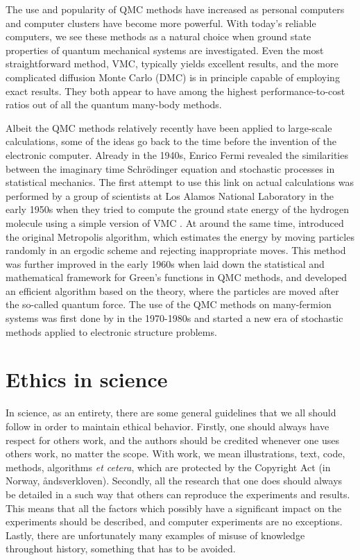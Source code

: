 The use and popularity of QMC methods have increased as personal computers and computer clusters have become more powerful. With today's reliable computers, we see these methods as a natural choice when ground state properties of quantum mechanical systems are investigated. Even the most straightforward method, VMC, typically yields excellent results, and the more complicated diffusion Monte Carlo (DMC) is in principle capable of employing exact results. They both appear to have among the highest performance-to-cost ratios out of all the quantum many-body methods. 

Albeit the QMC methods relatively recently have been applied to large-scale calculations, some of the ideas go back to the time before the invention of the electronic computer. Already in the 1940s, Enrico Fermi revealed the similarities between the imaginary time Schrödinger equation and stochastic processes in statistical mechanics\supercite{metropolis_monte_1949,ceperley_quantum_1986}. The first attempt to use this link on actual calculations was performed by a group of scientists at Los Alamos National Laboratory in the early 1950s when they tried to compute the ground state energy of the hydrogen molecule using a simple version of VMC \supercite{bajdich_electronic_2010}. At around the same time, \citet{metropolis_monte_1949} introduced the original Metropolis algorithm, which estimates the energy by moving particles randomly in an ergodic scheme and rejecting inappropriate moves. This method was further improved in the early 1960s when \citet{kalos} laid down the statistical and mathematical framework for Green's functions in QMC methods, and \citet{hastings_monte_1970} developed an efficient algorithm based on the theory, where the particles are moved after the so-called quantum force. The use of the QMC methods on many-fermion systems was first done by \citet{ceperley_quantum_1986} in the 1970-1980s and started a new era of stochastic methods applied to electronic structure problems. 

\section{Ethics in science}
In science, as an entirety, there are some general guidelines that we all should follow in order to maintain ethical behavior. Firstly, one should always have respect for others work, and the authors should be credited whenever one uses others work, no matter the scope. With work, we mean illustrations, text, code, methods, algorithms \textit{et cetera}, which are protected by the Copyright Act (in Norway, åndsverkloven). Secondly, all the research that one does should always be detailed in a such way that others can reproduce the experiments and results. This means that all the factors which possibly have a significant impact on the experiments should be described, and computer experiments are no exceptions. Lastly, there are unfortunately many examples of misuse of knowledge throughout history, something that has to be avoided.

